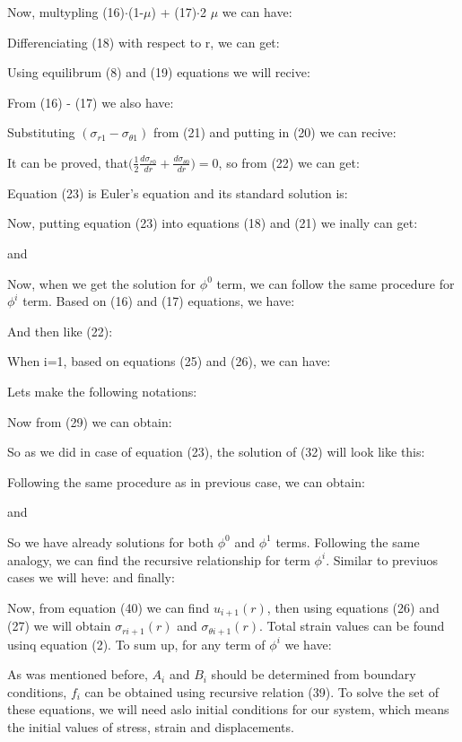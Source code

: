 \documentclass[review]{elsarticle}
\begin{document}
Now, multypling (16)$\cdot$(1-$\mu$)  + (17)$\cdot$2 $\mu$ we can have:
\EqEighteenPone
\EqEighteenPTwo

Differenciating (18) with respect to r, we can get:
\EqNineteenPOne
\EqNineteenPTwo

Using equilibrum (8)  and (19) equations we will recive:
\EqTwentyPOne
\EqTwentyPTwo

From (16) - (17) we also have:
\EqTwentyOne	

Substituting $(\sigma_{r1} - \sigma_{\theta1})$ from (21) and putting in (20) we can recive: 
\EqTwentyTwo

It can be proved, that$\Big(\frac{1}{2} \frac{d\sigma_{r0}}{dr} + \frac{d\sigma_{\theta0}}{dr}\Big) =0 $,
so from (22) we can get:
\EqTwentyThree

Equation (23) is Euler's equation and its standard solution is:
\EqTwentyFour


Now, putting equation (23) into equations  (18) and (21) we inally can get:
\EqTwentyFivePOne
\EqTwentyFivePTwo 	

and
\EqTwentySix

Now, when we get the solution for $\phi^{0}$ term, we can follow the same procedure for $\phi^{i}$ term.
Based on (16) and (17) equations, we have:
\MainSetTermIRad
\MainSetTermITan

And then like (22):
\EqTwentyNine

When i=1, based on equations (25) and (26), we can have:
\EqThirty

Lets make the following notations:
\EqThirtyOne
\EqThirtyTwo

Now from (29) we can obtain:
\EqThirtyThree

So as we did in case of equation (23), the solution of (32) will look like this:
\EqThirtyFour

Following the same procedure as in previous case, we can obtain:
\EqThirtyFivePOne
\EqThirtyFivePTwo 	

and
\EqThirtySix

So we have already solutions for both $\phi^{0}$ and $\phi^{1}$ terms. Following the same analogy, we can find the recursive relationship for term $\phi^{i}$. Similar to previuos cases we will heve:
\EqThirtySeven
\EqThirtyEigth
\EqThirtyNine
and finally:
\EqFourty

Now, from equation (40) we can find $u_{i+1}(r) $, then using equations (26) and (27) we will obtain   
$\sigma_{r i+1} (r)$ and $\sigma_{\theta i+1}(r)$. Total strain values can be found usinq equation (2).
To sum up, for any term of $\phi^{i}$ we have:
\EqFinDisplSol
\EqFinalStrRadSolOne
\EqFinalStrRadSolTwo
\EqFinalStrTanSolOne
\EqFinalStrTanSolTwo
\EqFinalStrainRadSol
\EqFinalStrainTanSol

As was mentioned before, $A_{i}$ and $B_{i}$ should be determined from boundary conditions, $f_{i}$ can be obtained using recursive relation (39). To solve the set of these equations, we will need aslo initial conditions for our system, which means the initial values of stress, strain and displacements.
\end{document}
